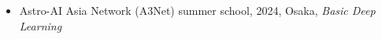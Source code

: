 \begin{itemize}
\item Astro-AI Asia Network (A3Net) summer school, 2024, Osaka, \emph{Basic Deep Learning} 
\end{itemize}
